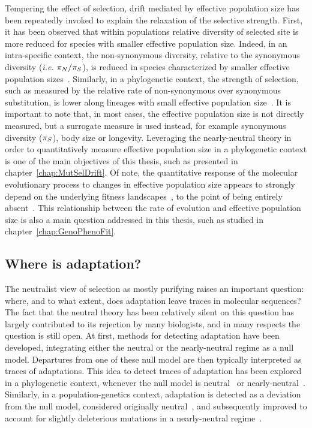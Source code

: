 Tempering the effect of selection, drift mediated by effective population size has been repeatedly invoked to explain the relaxation of the selective strength.
First, it has been observed that within populations relative diversity of selected site is more reduced for species with smaller effective population size.
Indeed, in an intra-specific context, the non-synonymous diversity, relative to the synonymous diversity (\textit{i.e.} $\pi_N / \pi_S$), is reduced in species characterized by smaller effective population sizes~\citep{Piganeau2009, Elyashiv2010, Galtier2016, Chen2017, James2017}.
Similarly, in a phylogenetic context, the strength of selection, such as measured by the relative rate of non-synonymous over synonymous substitution, is lower along lineages with small effective population size~\citep{Ohta1993, Tomoko1995a, Moran1996, Woolfit2003, Woolfit2005, Popadin2007}.
It is important to note that, in most cases, the effective population size is not directly measured, but a surrogate measure is used instead, for example synonymous diversity ($\pi_S$), body size or longevity.
Leveraging the nearly-neutral theory in order to quantitatively measure effective population size in a phylogenetic context is one of the main objectives of this thesis, such as presented in chapter~\ref{chap:MutSelDrift}.
Of note, the quantitative response of the molecular evolutionary process to changes in effective population size appears to strongly depend on the underlying fitness landscapes~\citep{Welch2008}, to the point of being entirely absent~\citep{Cherry1998, Goldstein2013}.
This relationship between the rate of evolution and effective population size is also a main question addressed in this thesis, such as studied in chapter~\ref{chap:GenoPhenoFit}.

\subsection{Where is adaptation?}
\label{subsec:where-is-adaptation?}

The neutralist view of selection as mostly purifying raises an important question: where, and to what extent, does adaptation leave traces in molecular sequences?
The fact that the neutral theory has been relatively silent on this question has largely contributed to its rejection by many biologists, and in many respects the question is still open.
At first, methods for detecting adaptation have been developed, integrating either the neutral or the nearly-neutral regime as a null model.
Departures from one of these null model are then typically interpreted as traces of adaptations.
This idea to detect traces of adaptation has been explored in a phylogenetic context, whenever the null model is neutral~\citep{Goldman1994, Muse1994, Yang2002, Zhang2004} or nearly-neutral~\citep{Rodrigue2016, Bloom2017}.
Similarly, in a population-genetics context, adaptation is detected as a deviation from the null model, considered originally neutral~\citep{McDonald1991, Charlesworth1994, Smith2002}, and subsequently improved to account for slightly deleterious mutations in a nearly-neutral regime~\citep{eyre-walker_estimating_2009, Galtier2016}.

